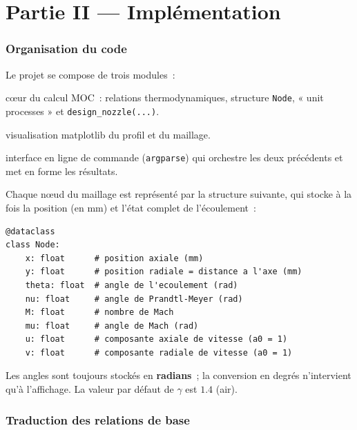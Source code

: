\documentclass[11pt,a4paper]{article}
\begin{document}
\part*{Partie II --- Implémentation}

\section{Organisation du code}

Le projet se compose de trois modules~:
\begin{description}[style=nextline,leftmargin=1.2cm,nosep]
  \item[\texttt{moc\_nozzle.py}] c\oe ur du calcul MOC~: relations
    thermodynamiques, structure \texttt{Node}, « unit processes » et
    \texttt{design\_nozzle(...)}.
  \item[\texttt{plot\_nozzle.py}] visualisation matplotlib du profil et du
    maillage.
  \item[\texttt{main.py}] interface en ligne de commande (\texttt{argparse})
    qui orchestre les deux précédents et met en forme les résultats.
\end{description}

Chaque n\oe ud du maillage est représenté par la structure suivante, qui stocke à
la fois la position (en mm) et l'état complet de l'écoulement~:

\begin{lstlisting}[style=py,caption={Structure d'un n\oe ud du maillage
(\texttt{moc\_nozzle.py}).}]
@dataclass
class Node:
    x: float      # position axiale (mm)
    y: float      # position radiale = distance a l'axe (mm)
    theta: float  # angle de l'ecoulement (rad)
    nu: float     # angle de Prandtl-Meyer (rad)
    M: float      # nombre de Mach
    mu: float     # angle de Mach (rad)
    u: float      # composante axiale de vitesse (a0 = 1)
    v: float      # composante radiale de vitesse (a0 = 1)
\end{lstlisting}

Les angles sont toujours stockés en \textbf{radians}~; la conversion en degrés
n'intervient qu'à l'affichage. La valeur par défaut de $\gamma$ est $1.4$ (air).

\section{Traduction des relations de base}
\end{document}
